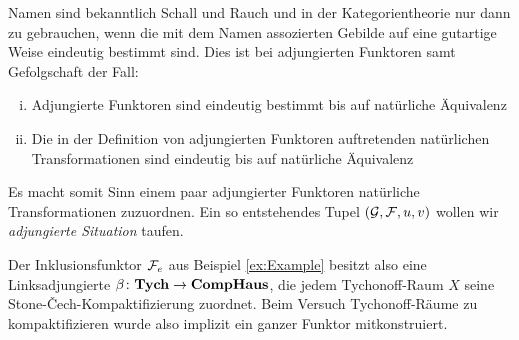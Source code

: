\begin{bem}
  Namen sind bekanntlich Schall und Rauch und in der Kategorientheorie nur dann zu gebrauchen, wenn die mit dem Namen assozierten Gebilde auf eine gutartige Weise eindeutig bestimmt sind.
  Dies ist bei adjungierten Funktoren samt Gefolgschaft der Fall:
  \begin{enumerate}[(i)]
    \item Adjungierte Funktoren sind eindeutig bestimmt bis auf natürliche Äquivalenz
    \item Die in der Definition von adjungierten Funktoren auftretenden natürlichen Transformationen sind eindeutig bis auf natürliche Äquivalenz
  \end{enumerate}
  Es macht somit Sinn einem paar adjungierter Funktoren natürliche Transformationen zuzuordnen. Ein so entstehendes Tupel $(\mathcal{G}, \mathcal{F}, u, v)$ wollen wir \emph{adjungierte Situation} taufen.
\end{bem}

\begin{ex} Der Inklusionsfunktor $\mathcal{F}_e$ aus Beispiel \ref{ex:Example} besitzt also eine Linksadjungierte $\beta \colon \mathbf{Tych} \to \mathbf{CompHaus}$, die jedem Tychonoff-Raum $X$ seine Stone-\v{C}ech-Kompaktifizierung zuordnet. Beim Versuch Tychonoff-Räume zu kompaktifizieren wurde also implizit ein ganzer Funktor mitkonstruiert.
\end{ex}


